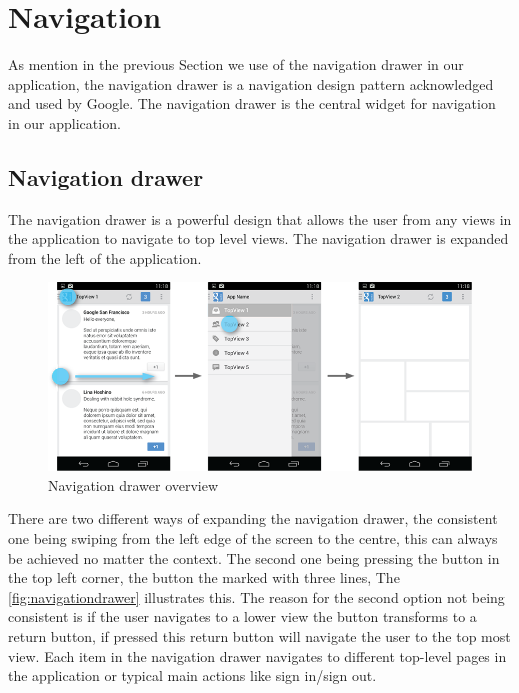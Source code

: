 \section{Navigation}\label{sec:navigation}
As mention in the previous Section we use of the navigation drawer in our application, the navigation drawer is a navigation design pattern acknowledged and used by Google.\cite{guidelines-navigationdrawer} The navigation drawer is the central widget for navigation in our application.
 
\subsection{Navigation drawer}
The navigation drawer is a powerful design that allows the user from any views in the application to navigate to top level views. The navigation drawer is expanded from the left of the application.
\begin{figure}[H]
\centering
\includegraphics[width=0.9\linewidth]{img/screenshots/navigation_drawer_overview.png}
\caption{Navigation drawer overview \cite{guidelines-navigationdrawer}}
\label{fig:navigationdrawer}
\end{figure}
There are two different ways of expanding the navigation drawer, the consistent one being swiping from the left edge of the screen to the centre, this can always be achieved no matter the context. 
The second one being pressing the button in the top left corner, the button the marked with three lines, The \autoref{fig:navigationdrawer} illustrates this. 
The reason for the second option not being consistent is if the user navigates to a lower view the button transforms to a return button, if pressed this return button will navigate the user to the top most view. 
Each item in the navigation drawer navigates to different top-level pages in the application or typical main actions like sign in/sign out.

